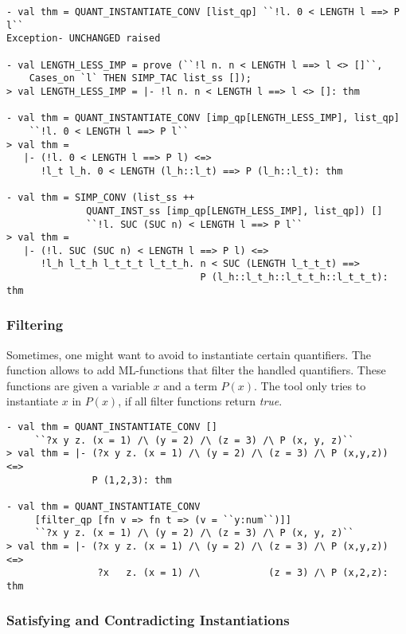 \begin{session}
\begin{verbatim}
- val thm = QUANT_INSTANTIATE_CONV [list_qp] ``!l. 0 < LENGTH l ==> P l`` 
Exception- UNCHANGED raised

- val LENGTH_LESS_IMP = prove (``!l n. n < LENGTH l ==> l <> []``, 
    Cases_on `l` THEN SIMP_TAC list_ss []);
> val LENGTH_LESS_IMP = |- !l n. n < LENGTH l ==> l <> []: thm

- val thm = QUANT_INSTANTIATE_CONV [imp_qp[LENGTH_LESS_IMP], list_qp] 
    ``!l. 0 < LENGTH l ==> P l``
> val thm =
   |- (!l. 0 < LENGTH l ==> P l) <=>
      !l_t l_h. 0 < LENGTH (l_h::l_t) ==> P (l_h::l_t): thm

- val thm = SIMP_CONV (list_ss ++ 
              QUANT_INST_ss [imp_qp[LENGTH_LESS_IMP], list_qp]) [] 
              ``!l. SUC (SUC n) < LENGTH l ==> P l``
> val thm =
   |- (!l. SUC (SUC n) < LENGTH l ==> P l) <=>
      !l_h l_t_h l_t_t_t l_t_t_h. n < SUC (LENGTH l_t_t_t) ==> 
                                  P (l_h::l_t_h::l_t_t_h::l_t_t_t): thm
\end{verbatim}
\end{session}

  
\subsubsection{Filtering}
Sometimes, one might want to avoid to instantiate certain quantifiers. 
The function  allows to add ML-functions that filter the handled
quantifiers. These functions are given a variable $x$ and a term $P(x)$. 
The tool only tries to instantiate $x$ in $P(x)$, if all filter functions
return \textit{true}.  

\begin{session}
\begin{verbatim}
- val thm = QUANT_INSTANTIATE_CONV [] 
     ``?x y z. (x = 1) /\ (y = 2) /\ (z = 3) /\ P (x, y, z)``
> val thm = |- (?x y z. (x = 1) /\ (y = 2) /\ (z = 3) /\ P (x,y,z)) <=> 
               P (1,2,3): thm

- val thm = QUANT_INSTANTIATE_CONV 
     [filter_qp [fn v => fn t => (v = ``y:num``)]] 
     ``?x y z. (x = 1) /\ (y = 2) /\ (z = 3) /\ P (x, y, z)``
> val thm = |- (?x y z. (x = 1) /\ (y = 2) /\ (z = 3) /\ P (x,y,z)) <=>
                ?x   z. (x = 1) /\            (z = 3) /\ P (x,2,z): thm
\end{verbatim}
\end{session}

\subsubsection{Satisfying and Contradicting Instantiations}

